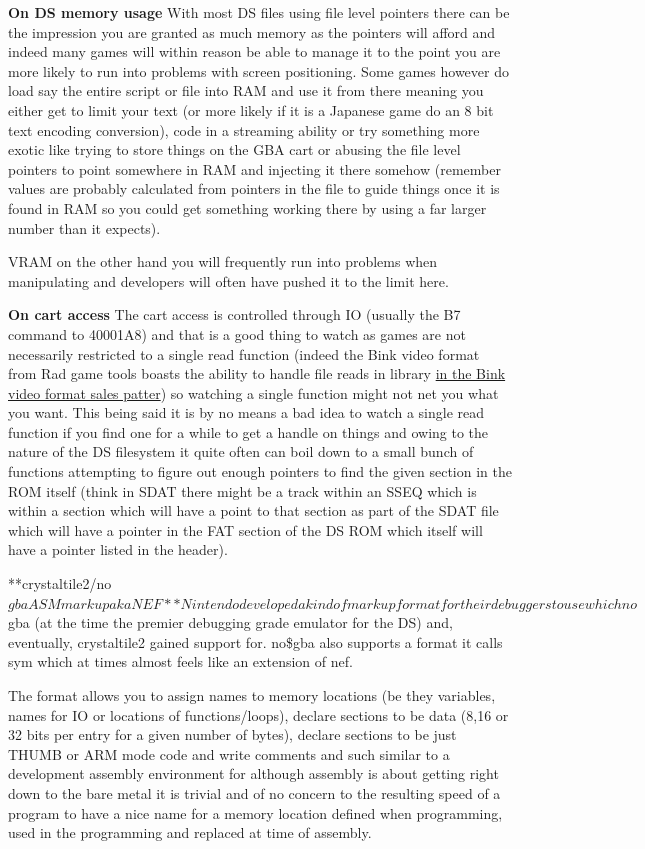 \documentclass[
]{book}
\begin{document}
\textbf{On DS memory usage} With most DS files using file level pointers there can be the impression you are granted as much memory as the pointers will afford and indeed many games will within reason be able to manage it to the point you are more likely to run into problems with screen positioning. Some games however do load say the entire script or file into RAM and use it from there meaning you either get to limit your text (or more likely if it is a Japanese game do an 8 bit text encoding conversion), code in a streaming ability or try something more exotic like trying to store things on the GBA cart or abusing the file level pointers to point somewhere in RAM and injecting it there somehow (remember values are probably calculated from pointers in the file to guide things once it is found in RAM so you could get something working there by using a far larger number than it expects).

VRAM on the other hand you will frequently run into problems when manipulating and developers will often have pushed it to the limit here.

\textbf{On cart access} The cart access is controlled through IO (usually the B7 command to 40001A8) and that is a good thing to watch as games are not necessarily restricted to a single read function (indeed the Bink video format from Rad game tools boasts the ability to handle file reads in library \href{http://www.radgametools.com/binksdk.htm}{in the Bink video format sales patter}) so watching a single function might not net you what you want. This being said it is by no means a bad idea to watch a single read function if you find one for a while to get a handle on things and owing to the nature of the DS filesystem it quite often can boil down to a small bunch of functions attempting to figure out enough pointers to find the given section in the ROM itself (think in SDAT there might be a track within an SSEQ which is within a section which will have a point to that section as part of the SDAT file which will have a pointer in the FAT section of the DS ROM which itself will have a pointer listed in the header).

**crystaltile2/no\(gba ASM markup aka NEF** Nintendo developed a kind of markup format for their debuggers to use which no\)gba (at the time the premier debugging grade emulator for the DS) and, eventually, crystaltile2 gained support for. no\$gba also supports a format it calls sym which at times almost feels like an extension of nef.

The format allows you to assign names to memory locations (be they variables, names for IO or locations of functions/loops), declare sections to be data (8,16 or 32 bits per entry for a given number of bytes), declare sections to be just THUMB or ARM mode code and write comments and such similar to a development assembly environment for although assembly is about getting right down to the bare metal it is trivial and of no concern to the resulting speed of a program to have a nice name for a memory location defined when programming, used in the programming and replaced at time of assembly.
\end{document}
